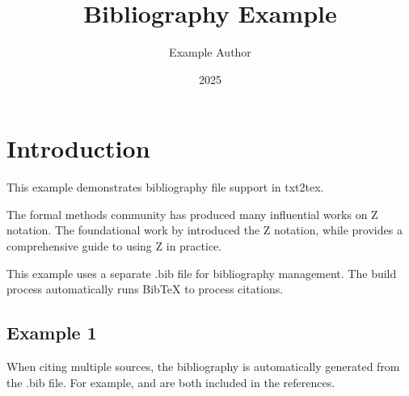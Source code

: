 \documentclass[a4paper,10pt,fleqn]{article}
\title{Bibliography Example}
\author{Example Author}
\date{2025}
\begin{document}
\maketitle

\section*{Introduction}

\noindent This example demonstrates bibliography file support in txt2tex.

\bigskip

\noindent The formal methods community has produced many influential works on Z notation. The foundational work by \citep{spivey92} introduced the Z notation, while \citep{woodcock96} provides a comprehensive guide to using Z in practice.

\bigskip

\noindent This example uses a separate .bib file for bibliography management. The build process automatically runs BibTeX to process citations.

\bigskip

\subsection*{Example 1}

\noindent When citing multiple sources, the bibliography is automatically generated from the .bib file. For example, \citep{spivey92} and \citep{woodcock96} are both included in the references.

\bigskip

\setlength{\leftskip}{0pt}




\end{document}
